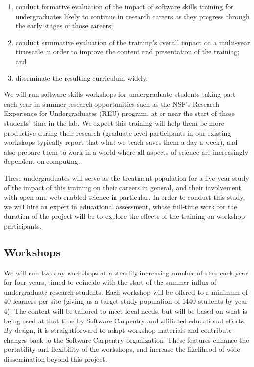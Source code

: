 \documentclass{proposalnsf}
\begin{document}
\begin{enumerate}

\item
  conduct formative evaluation of the impact of software skills
  training for undergraduates likely to continue in research careers
  as they progress through the early stages of those careers;

\item
  conduct summative evaluation of the training's overall impact on a
  multi-year timescale in order to improve the content and
  presentation of the training; and

\item
  disseminate the resulting curriculum widely.

\end{enumerate}

We will run software-skills workshops for undergraduate students
taking part each year in summer research opportunities such as the
NSF's Research Experience for Undergraduates (REU) program, at or near
the start of those students' time in the lab.  We expect this training
will help them be more productive during their research (graduate-level
participants in our existing workshops typically report that what we
teach saves them a day a week), and also prepare them to work in a
world where all aspects of science are increasingly dependent on
computing.

These undergraduates will serve as the treatment population for a
five-year study of the impact of this training on their careers in
general, and their involvement with open and web-enabled science in
particular.  In order to conduct this study, we will hire an expert in
educational assessment, whose full-time work for the duration of the
project will be to explore the effects of the training on workshop
participants.

\subsection{Workshops}

We will run two-day workshops at a steadily increasing number of sites
each year for four years, timed to coincide with the start of the
summer influx of undergraduate research students.  Each workshop will
be offered to a minimum of 40 learners per site (giving us a target
study population of 1440 students by year 4).  The content will be
tailored to meet local needs, but will be based on what is being used
at that time by Software Carpentry and affiliated educational efforts.
By design, it is straightforward to adapt workshop materials and
contribute changes back to the Software Carpentry organization.  These
features enhance the portability and flexibility of the workshops, and
increase the likelihood of wide dissemination beyond this project.
\end{document}
